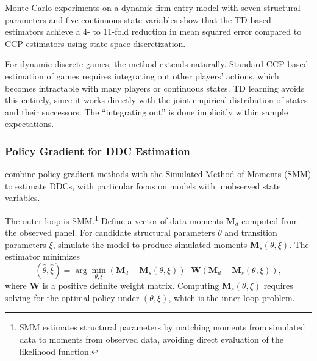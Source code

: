 Monte Carlo experiments on a dynamic firm entry model with seven structural parameters and five continuous state variables show that the TD-based estimators achieve a 4- to 11-fold reduction in mean squared error compared to CCP estimators using state-space discretization.

For dynamic discrete games, the method extends naturally. Standard CCP-based estimation of games requires integrating out other players' actions, which becomes intractable with many players or continuous states. TD learning avoids this entirely, since it works directly with the joint empirical distribution of states and their successors. The ``integrating out'' is done implicitly within sample expectations.


\subsubsection{Policy Gradient for DDC Estimation}

\citet{HuYang2025} combine policy gradient methods with the Simulated Method of Moments (SMM) to estimate DDCs, with particular focus on models with unobserved state variables.

The outer loop is SMM.\footnote{SMM \citep{GourierouxMonfort1993} estimates structural parameters by matching moments from simulated data to moments from observed data, avoiding direct evaluation of the likelihood function.} Define a vector of data moments $\mathbf{M}_d$ computed from the observed panel. For candidate structural parameters $\theta$ and transition parameters $\xi$, simulate the model to produce simulated moments $\mathbf{M}_s(\theta, \xi)$. The estimator minimizes
\begin{equation}
(\hat{\theta}, \hat{\xi}) = \arg\min_{\theta, \xi} \left(\mathbf{M}_d - \mathbf{M}_s(\theta, \xi)\right)^\top \mathbf{W} \left(\mathbf{M}_d - \mathbf{M}_s(\theta, \xi)\right), \label{eq:hy_outer}
\end{equation}
where $\mathbf{W}$ is a positive definite weight matrix. Computing $\mathbf{M}_s(\theta, \xi)$ requires solving for the optimal policy under $(\theta, \xi)$, which is the inner-loop problem.

